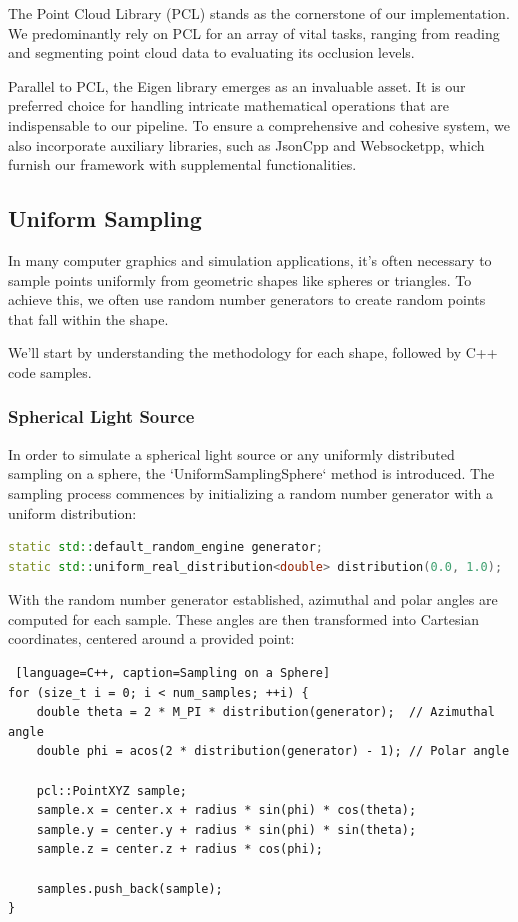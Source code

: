 \documentclass[11pt, a4paper,oneside,chapterprefix=false]{scrbook}
\begin{document}
The Point Cloud Library (PCL) stands as the cornerstone of our implementation. We predominantly rely on PCL for an array of vital tasks, ranging from reading and segmenting point cloud data to evaluating its occlusion levels.

Parallel to PCL, the Eigen library emerges as an invaluable asset. It is our preferred choice for handling intricate mathematical operations that are indispensable to our pipeline. To ensure a comprehensive and cohesive system, we also incorporate auxiliary libraries, such as JsonCpp and Websocketpp, which furnish our framework with supplemental functionalities.

\subsection{Uniform Sampling}\label{subsec:uniform sampling}

In many computer graphics and simulation applications, it's often necessary to sample points uniformly from geometric shapes like spheres or triangles. To achieve this, we often use random number generators to create random points that fall within the shape.

We'll start by understanding the methodology for each shape, followed by C++ code samples.

\subsubsection{Spherical Light Source}

In order to simulate a spherical light source or any uniformly distributed sampling on a sphere, the `UniformSamplingSphere` method is introduced. The sampling process commences by initializing a random number generator with a uniform distribution:

\begin{lstlisting}[language=C++, caption=Spherical Sampling Initialization]
static std::default_random_engine generator;
static std::uniform_real_distribution<double> distribution(0.0, 1.0);
\end{lstlisting}

With the random number generator established, azimuthal and polar angles are computed for each sample. These angles are then transformed into Cartesian coordinates, centered around a provided point:

\begin{lstlisting} [language=C++, caption=Sampling on a Sphere]
for (size_t i = 0; i < num_samples; ++i) {
	double theta = 2 * M_PI * distribution(generator);  // Azimuthal angle
	double phi = acos(2 * distribution(generator) - 1); // Polar angle

	pcl::PointXYZ sample;
	sample.x = center.x + radius * sin(phi) * cos(theta);
	sample.y = center.y + radius * sin(phi) * sin(theta);
	sample.z = center.z + radius * cos(phi);

	samples.push_back(sample);
}
\end{lstlisting}
\end{document}
